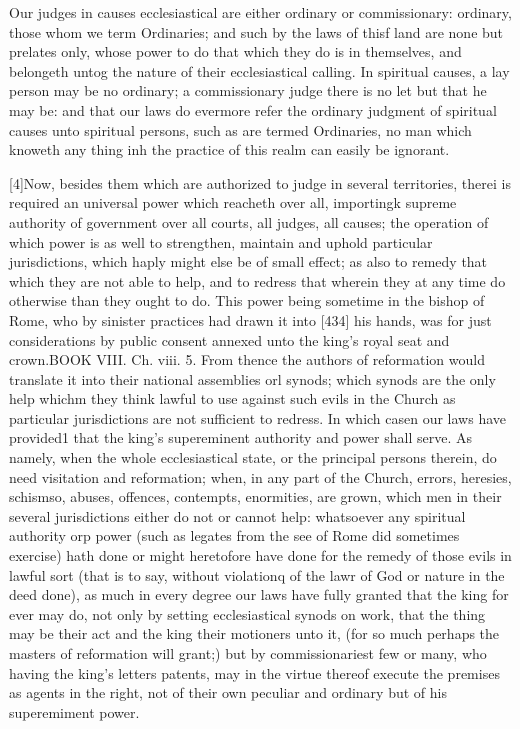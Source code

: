 Our judges in causes ecclesiastical are either ordinary or commissionary: ordinary, those whom we term Ordinaries; and such by the laws of thisf land are none but prelates only, whose power to do that which they do is in themselves, and belongeth untog the nature of their ecclesiastical calling. In spiritual causes, a lay person may be no ordinary; a commissionary judge there is no let but that he may be: and that our laws do evermore refer the ordinary judgment of spiritual causes unto spiritual persons, such as are termed Ordinaries, no man which knoweth any thing inh the practice of this realm can easily be ignorant.

[4]Now, besides them which are authorized to judge in several territories, therei is required an universal power which reacheth over all, importingk supreme authority of government over all courts, all judges, all causes; the operation of which power is as well to strengthen, maintain and uphold particular jurisdictions, which haply might else be of small effect; as also to remedy that which they are not able to help, and to redress that wherein they at any time do otherwise than they ought to do. This power being sometime in the bishop of Rome, who by sinister practices had drawn it into [434] his hands, was for just considerations by public consent annexed unto the king’s royal seat and crown.BOOK VIII. Ch. viii. 5. From thence the authors of reformation would translate it into their national assemblies orl synods; which synods are the only help whichm they think lawful to use against such evils in the Church as particular jurisdictions are not sufficient to redress. In which casen our laws have provided1 that the king’s supereminent authority and power shall serve. As namely, when the whole ecclesiastical state, or the principal persons therein, do need visitation and reformation; when, in any part of the Church, errors, heresies, schismso, abuses, offences, contempts, enormities, are grown, which men in their several jurisdictions either do not or cannot help: whatsoever any spiritual authority orp power (such as legates from the see of Rome did sometimes exercise) hath done or might heretofore have done for the remedy of those evils in lawful sort (that is to say, without violationq of the lawr of God or nature in the deed done), as much in every degree our laws have fully granted that the king for ever may do, not only by setting ecclesiastical synods on work, that the thing may be their act and the king their motioners unto it, (for so much perhaps the masters of reformation will grant;) but by commissionariest few or many, who having the king’s letters patents, may in the virtue thereof execute the premises as agents in the right, not of their own peculiar and ordinary but of his superemiment power.

